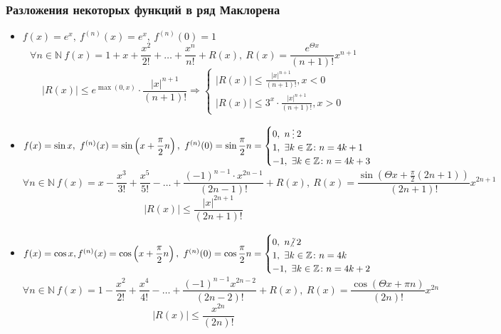 \subsubsection{Разложения некоторых функций в ряд Маклорена}
\begin{itemize}
	\item $f(x) = e^x, \
	f^{(n)}(x) = e^x, \
	f^{(n)}(0) = 1$
	\begin{equation*}
	\forall n \in \mathbb N \ f(x) = 1 + x + \frac{x^2}{2!} + \ldots + \frac{x^n}{n!} + R(x), \
	R(x) = \frac{e^{\Theta x}}{(n + 1)!} x^{n + 1}
	\end{equation*}
	\begin{equation*}
	|R(x)| \leqslant e^{\max(0, x)} \cdot \frac{|x|^{n + 1}}{(n + 1)!} \Rightarrow
	\begin{cases}
	\displaystyle |R(x)| \leqslant \frac{|x|^{n + 1}}{(n + 1)!}, x < 0 \\
	\displaystyle |R(x)| \leqslant 3^x \cdot \frac{|x|^{n + 1}}{(n + 1)!}, x > 0
	\end{cases}
	\end{equation*}
	
	\item $f(x) = \sin x, \
	f^{(n)}(x) = \sin \left( x + \dfrac\pi{2} n \right), \
	f^{(n)}(0) = \sin \dfrac\pi{2} n =
	\begin{cases}
	0, \ n \mult 2 \\
	1, \ \exists k \in \mathbb Z \colon n = 4k + 1 \\
	-1, \ \exists k \in \mathbb Z \colon n = 4k + 3
	\end{cases}$
	\begin{equation*}
	\forall n \in \mathbb N \ f(x) = x - \frac{x^3}{3!} + \frac{x^5}{5!} - \ldots + \frac{(-1)^{n-1} \cdot x^{2n-1}}{(2n - 1)!} + R(x), \
	R(x) = \frac{\sin \left( \Theta x + \frac\pi{2} (2n + 1) \right)}{(2n + 1)!} x^{2n+1}
	\end{equation*}
	\begin{equation*}
	|R(x)| \leqslant \frac{|x|^{2n+1}}{(2n + 1)!}
	\end{equation*}
	
	\item $f(x) = \cos x,
	f^{(n)}(x) = \cos \left( x + \dfrac\pi{2} n \right), \
	f^{(n)}(0) = \cos \dfrac\pi{2} n =
	\begin{cases}
	0, \ n \notmult 2 \\
	1, \ \exists k \in \mathbb Z \colon n = 4k \\
	-1, \ \exists k \in \mathbb Z \colon n = 4k + 2
	\end{cases}$
	\begin{equation*}
	\forall n \in \mathbb N \ f(x) = 1 - \frac{x^2}{2!} + \frac{x^4}{4!} - \ldots + \frac{(-1)^{n-1} x^{2n-2}}{(2n - 2)!} + R(x), \
	R(x) = \frac{\cos (\Theta x + \pi n)}{(2n)!} x^{2n}
	\end{equation*}
	\begin{equation*}
	|R(x)| \leqslant \frac{x^{2n}}{(2n)!}
	\end{equation*}
	

\end{itemize}
